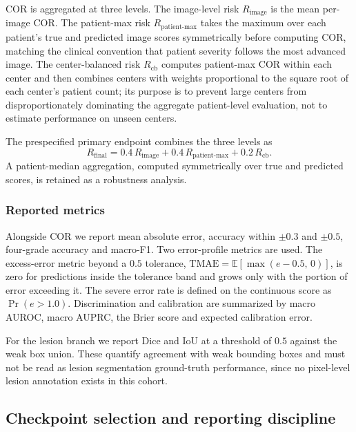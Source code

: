 COR is aggregated at three levels. The image-level risk $R_{\mathrm{image}}$ is
the mean per-image COR. The patient-max risk $R_{\mathrm{patient\text{-}max}}$
takes the maximum over each patient's true and predicted image scores
symmetrically before computing COR, matching the clinical convention that
patient severity follows the most advanced image. The center-balanced risk
$R_{\mathrm{cb}}$ computes patient-max COR within each center and then combines
centers with weights proportional to the square root of each center's patient
count; its purpose is to prevent large centers from disproportionately
dominating the aggregate patient-level evaluation, not to estimate performance
on unseen centers.

The prespecified primary endpoint combines the three levels as
\begin{equation}
R_{\mathrm{final}} = 0.4\,R_{\mathrm{image}} + 0.4\,R_{\mathrm{patient\text{-}max}}
                   + 0.2\,R_{\mathrm{cb}}.
\label{eq:rfinal}
\end{equation}
A patient-median aggregation, computed symmetrically over true and predicted
scores, is retained as a robustness analysis.

\subsubsection{Reported metrics}

Alongside COR we report mean absolute error, accuracy within $\pm0.3$ and
$\pm0.5$, four-grade accuracy and macro-F1. Two error-profile metrics are used.
The excess-error metric beyond a $0.5$ tolerance,
$\mathrm{TMAE} = \mathbb{E}[\max(e-0.5,\,0)]$, is zero for predictions inside
the tolerance band and grows only with the portion of error exceeding it. The
severe error rate is defined on the continuous score as
$\Pr(e>1.0)$. Discrimination and calibration are summarized by macro AUROC,
macro AUPRC, the Brier score and expected calibration error.

For the lesion branch we report Dice and IoU at a threshold of $0.5$ against the
weak box union. These quantify agreement with weak bounding boxes and must not
be read as lesion segmentation ground-truth performance, since no pixel-level
lesion annotation exists in this cohort.

\subsection{Checkpoint selection and reporting discipline}

